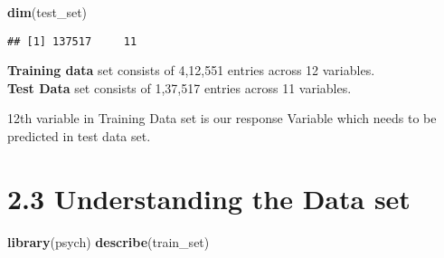 \documentclass[]{article}
\newenvironment{Shaded}{\begin{snugshade}}{\end{snugshade}}
\newcommand{\KeywordTok}[1]{\textcolor[rgb]{0.13,0.29,0.53}{\textbf{#1}}}
\newcommand{\NormalTok}[1]{#1}
\begin{document}
\begin{Shaded}
\begin{Highlighting}[]
\KeywordTok{dim}\NormalTok{(test_set)}
\end{Highlighting}
\end{Shaded}

\begin{verbatim}
## [1] 137517     11
\end{verbatim}

\textbf{Training data} set consists of 4,12,551 entries across 12
variables.\\
\textbf{Test Data} set consists of 1,37,517 entries across 11 variables.

12th variable in Training Data set is our response Variable which needs
to be predicted in test data set.

\section{2.3 Understanding the Data
set}\label{understanding-the-data-set}

\begin{Shaded}
\begin{Highlighting}[]
\KeywordTok{library}\NormalTok{(psych)}
\KeywordTok{describe}\NormalTok{(train_set)}
\end{Highlighting}
\end{Shaded}
\end{document}
